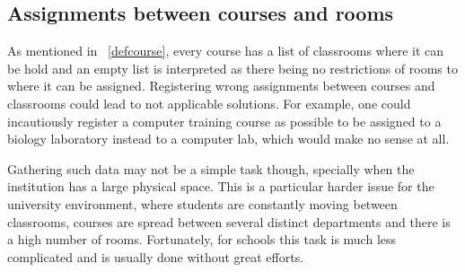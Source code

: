 \subsection{Assignments between courses and rooms}

As mentioned in ~\ref{defcourse}, every course has a list of classrooms where it can be hold and an empty list is interpreted as there being no restrictions of rooms to where it can be assigned. Registering wrong assignments between courses and classrooms could lead to not applicable solutions. For example, one could incautiously register a computer training course as possible to be assigned to a biology laboratory instead to a computer lab, which would make no sense at all.

Gathering such data may not be a simple task though, specially when the institution has a large physical space. This is a particular harder issue for the university environment, where students are constantly moving between classrooms, courses are spread between several distinct departments and there is a high number of rooms. Fortunately, for schools this task is much less complicated and is usually done without great efforts.




